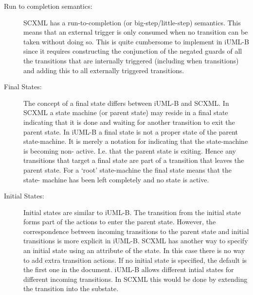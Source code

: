 \begin{description}

\item [Run to completion semantics:] SCXML has a run-to-completion 
(or big-step/little-step) semantics. This means that an external 
trigger is only consumed when no transition can be taken without 
doing so. This is quite cumbersome to implement in iUML-B since 
it requires constructing the conjunction of the negated guards of
all the transitions that are internally triggered (including when 
transitions) and adding this to all externally triggered transitions.

\item [Final States:]
The concept of a final state differs between iUML-B and 
SCXML. In SCXML a state machine (or parent state) may 
reside in a final state indicating that it is done and 
waiting for another transition to exit the parent 
state.  In iUML-B a final state is not a proper state 
of the parent state-machine. It is merely a notation 
for indicating that the state-machine is becoming non-
active. I.e. that the parent state is exiting. Hence 
any transitions that target a final state are part of a 
transition that leaves the parent state. For a ‘root’ 
state-machine the final state means that the state-
machine has been left completely and no state is active.

\item [Initial States:]
Initial states are similar to iUML-B. The transition 
from the initial state forms part of the actions to 
enter the parent state. However, the correspondence 
between incoming transitions to the parent state and 
initial transitions is more explicit in iUML-B. 
SCXML has another way to specify an initial state using 
an attribute of the state. In this case there is no way 
to add extra transition actions.
If no initial state is specified, the default is the 
first one in the document.
iUML-B allows different intial states for different 
incoming transitions. In SCXML this would be done by 
extending the transition into the substate.



\end{description}



